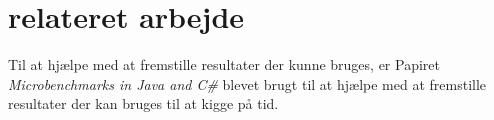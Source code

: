 \section{relateret arbejde}

Til at hjælpe med at fremstille resultater der kunne bruges, er Papiret \textit{Microbenchmarks in Java and C\#}\cite{Microbenchmarks} blevet brugt til at hjælpe med at fremstille resultater der kan bruges til at kigge på tid.